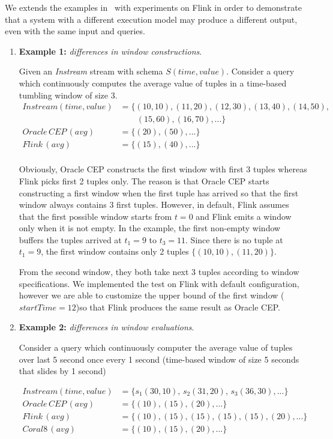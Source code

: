 We extends the examples in~\citep{Dindar:2013} with experiments on Flink in order to demonstrate that a system with a different execution model may produce a different output, even with the same input and queries. 
\begin{enumerate}

\item \textbf{Example 1:} \textit{differences in window constructions}.

Given an \textit{Instream} stream with schema $S(time, value)$. Consider a query which continuously computes the average value of tuples in a time-based tumbling window of size 3.
\begin{align*}
Instream(time,value) &= \{(10,10),(11,20),(12,30),(13,40),(14,50),\\
&\qquad (15,60),(16,70),...\} \\
Oracle\, CEP\, (avg)		&= \{(20), (50),...\} \\
Flink\, (avg)			&= \{(15), (40),...\} \\
\end{align*}

Obviously, Oracle CEP constructs the first window with first 3 tuples whereas Flink picks first 2 tuples only. The reason is that Oracle CEP starts constructing a first window when the first tuple has arrived so that the first window always contains 3 first tuples. However, in default, Flink assumes that the first possible window starts from $t = 0$ and Flink emits a window only when it is not empty. In the example, the first non-empty window buffers the tuples arrived at $t_1=9$ to $t_3=11$. Since there is no tuple at $t_1 = 9$, the first window contains only 2 tuples $\{(10,10),(11,20)\}$.

From the second window, they both take next 3 tuples according to window specifications. We implemented the test on Flink with default configuration, however we are able to customize the upper bound of the first window ($startTime = 12$)so that Flink produces the same result as Oracle CEP.


\item \textbf{Example 2:} \textit{differences in window evaluations}.

Consider a query which continuously computer the average value of tuples over last 5 second once every 1 second (time-based window of size 5 seconds that slides by 1 second)

\begin{align*}
Instream(time,value) 	&= \{s_1(30,10),\,s_2(31,20),\,s_3(36,30),...\} \\
Oracle\, CEP\, (avg)		&= \{(10), (15),(20),...\} \\
Flink\, (avg)			&= \{(10), (15), (15), (15), (15), (20),...\}\\
Coral8\, (avg)			&= \{(10), (15),(20),...\}			
\end{align*}


\end{enumerate}
